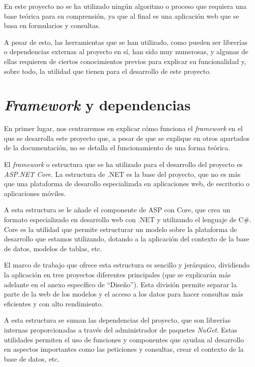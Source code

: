 \label{Conceptos Teóricos}

En este proyecto no se ha utilizado ningún algoritmo o proceso que requiera una base teórica para su comprensión, ya que al final es una aplicación web que se basa en formularios y consultas.

A pesar de esto, las herramientas que se han utilizado, como pueden ser librerías o dependencias externas al proyecto en sí, han sido muy numerosas, y algunas de ellas requieren de ciertos conocimientos previos para explicar su funcionalidad y, sobre todo, la utilidad que tienen para el desarrollo de este proyecto.

\section{\emph{Framework} y dependencias}
En primer lugar, nos centraremos en explicar cómo funciona el \emph{framework} en el que se desarrolla este proyecto que, a pesar de que se explique en otros apartados de la documentación, no se detalla el funcionamiento de una forma teórica.

El \emph{framework} o estructura que se ha utilizado para el desarrollo del proyecto es \emph{ASP.NET Core}. La estructura de .NET es la base del proyecto, que no es más que una plataforma de desarollo especializada en aplicaciones web, de escritorio o aplicaciones móviles.

A esta estructura se le añade el componente de ASP con Core, que crea un formato especializado en desarrollo web con .NET y utilizando el lenguaje de C\#. Core es la utilidad que permite estructurar un modelo sobre la plataforma de desarrollo que estamos utilizando, dotando a la aplicación del contexto de la base de datos, modelos de tablas, etc.

El marco de trabajo que ofrece esta estructura es sencillo y jerárquico, dividiendo la aplicación en tres proyectos diferentes principales (que se explicarán más adelante en el anexo específico de ``Diseño''). Esta división permite separar la parte de la web de los modelos y el acceso a los datos para hacer consultas más eficientes y con alto rendimiento.

A esta estructura se suman las dependencias del proyecto, que son librerías internas proporcionadas a través del administrador de paquetes \emph{NuGet}. Estas utilidades permiten el uso de funciones y componentes que ayudan al desarrollo en aspectos importantes como las peticiones y consultas, crear el contexto de la base de datos, etc.

